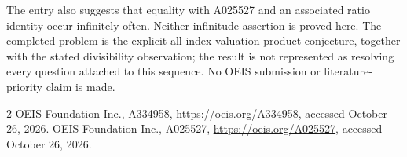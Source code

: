 \documentclass[10pt]{article}
\begin{document}
The entry also suggests that equality with A025527 and an associated ratio identity occur infinitely often. Neither infinitude assertion is proved here. The completed problem is the explicit all-index valuation-product conjecture, together with the stated divisibility observation; the result is not represented as resolving every question attached to this sequence. No OEIS submission or literature-priority claim is made.
\begin{thebibliography}{2}
 OEIS Foundation Inc., A334958, \url{https://oeis.org/A334958}, accessed October 26, 2026.
 OEIS Foundation Inc., A025527, \url{https://oeis.org/A025527}, accessed October 26, 2026.
\end{thebibliography}
\end{document}
